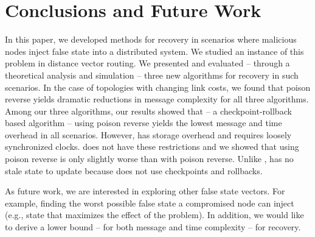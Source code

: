 \section{Conclusions and Future Work}
\label{sec:future}

In this paper, we developed methods for recovery in scenarios where malicious nodes inject false state into a distributed system.  
We studied an instance of this problem in distance vector routing. 
We presented and evaluated -- through a theoretical analysis and simulation -- three new algorithms for recovery in such scenarios. %
In the case of topologies with changing link costs, we found that poison reverse yields dramatic reductions in message complexity for all three algorithms. 
Among our three algorithms, our results showed that \cpr -- a checkpoint-rollback based algorithm -- using poison reverse yields the lowest message and time overhead in all scenarios. 
However, \cpr has storage overhead and requires loosely synchronized clocks. %
\purge does not have these restrictions and we showed that \purge using poison reverse is only slightly worse than \cpr with poison reverse.
Unlike \cprs, \purge has no stale state to update because \purge does not use checkpoints and rollbacks. 

As future work, we are interested in exploring other false state vectors.  For example, finding the worst possible false state a compromised node can inject (e.g., state that maximizes the effect of the \infinity problem).  In addition,
we would like to derive a lower bound -- for both message and time complexity -- for recovery.



